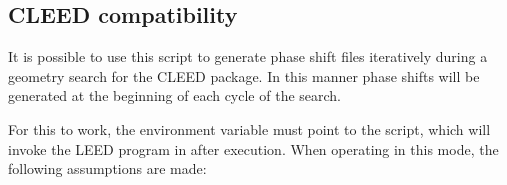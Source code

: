 \documentclass[letterpaper,10pt,english]{sphinxmanual}
\begin{document}
\subsection{CLEED compatibility}
\label{scripts:cleed-compatibility}
It is possible to use this script to generate phase shift files iteratively
during a geometry search for the CLEED package. In this manner phase shifts
will be generated at the beginning of each cycle of the search.

For this to work, the environment variable  must point to the
 script, which will invoke the LEED program in 
after execution. When operating in this mode, the following assumptions are made:
\end{document}
